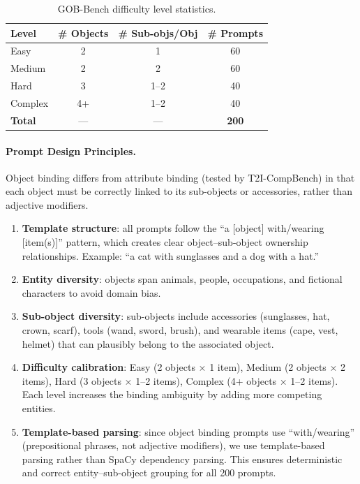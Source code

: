 \documentclass[sigconf,nonacm]{acmart}
\begin{document}
\begin{table}[t]
\centering
\caption{GOB-Bench difficulty level statistics.}
\label{tab:gob_stats}
\begin{tabular}{l c c c}
\toprule
Level & \# Objects & \# Sub-objs/Obj & \# Prompts \\
\midrule
Easy     & 2 & 1     & 60 \\
Medium   & 2 & 2     & 60 \\
Hard     & 3 & 1--2  & 40 \\
Complex  & 4+ & 1--2  & 40 \\
\midrule
\textbf{Total} & --- & --- & \textbf{200} \\
\bottomrule
\end{tabular}
\end{table}

\paragraph{Prompt Design Principles.}
Object binding differs from attribute binding (tested by T2I-CompBench) in that each object must be correctly linked to its sub-objects or accessories, rather than adjective modifiers.
\begin{enumerate}
\item \textbf{Template structure}: all prompts follow the ``a [object] with/wearing [item(s)]'' pattern, which creates clear object--sub-object ownership relationships. Example: ``a cat with sunglasses and a dog with a hat.''
\item \textbf{Entity diversity}: objects span animals, people, occupations, and fictional characters to avoid domain bias.
\item \textbf{Sub-object diversity}: sub-objects include accessories (sunglasses, hat, crown, scarf), tools (wand, sword, brush), and wearable items (cape, vest, helmet) that can plausibly belong to the associated object.
\item \textbf{Difficulty calibration}: Easy (2 objects $\times$ 1 item), Medium (2 objects $\times$ 2 items), Hard (3 objects $\times$ 1--2 items), Complex (4+ objects $\times$ 1--2 items). Each level increases the binding ambiguity by adding more competing entities.
\item \textbf{Template-based parsing}: since object binding prompts use ``with/wearing'' (prepositional phrases, not adjective modifiers), we use template-based parsing rather than SpaCy dependency parsing. This ensures deterministic and correct entity--sub-object grouping for all 200 prompts.
\end{enumerate}
\end{document}
